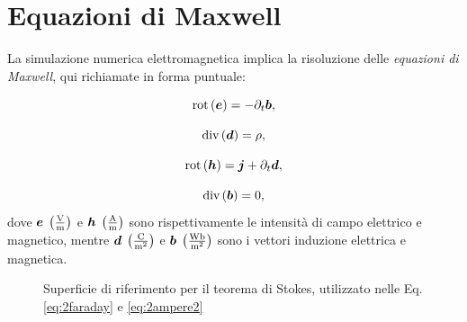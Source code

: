 

\label{cap:maxwell}

\section{Equazioni di Maxwell}

La simulazione numerica elettromagnetica implica la risoluzione delle \textit{equazioni di Maxwell}, qui richiamate in forma puntuale:

\begin{equation}
	\label{eq:2max1}
	\text{rot}\left(\boldsymbol{e}\right)=-\partial_t \boldsymbol{b},
\end{equation}

\begin{equation}
	\label{eq:2max2}
	\text{div}\left(\boldsymbol{d}\right)=\rho,
\end{equation}

\begin{equation}
	\label{eq:2max3}
	\text{rot}\left(\boldsymbol{h}\right)=\boldsymbol{j}+\partial_t \boldsymbol{d},
\end{equation}

\begin{equation}
	\label{eq:2max4}
	\text{div}\left(\boldsymbol{b}\right)=0,
\end{equation}
dove $\boldsymbol{e} \; \left( \frac{\text{V}}{\text{m}} \right)$ e $\boldsymbol{h} \; \left( \frac{\text{A}}{\text{m}} \right)$ sono rispettivamente le intensità di campo elettrico e magnetico, mentre $\boldsymbol{d} \; \left( \frac{\text{C}}{\text{m}^2} \right)$ e $\boldsymbol{b} \; \left( \frac{\text{Wb}}{\text{m}^2} \right)$ sono i vettori induzione elettrica e magnetica. 
\begin{figure}
\caption{Superficie di riferimento per il teorema di Stokes, utilizzato nelle Eq. \eqref{eq:2faraday} e \eqref{eq:2ampere2}}
\label{fig:2.1}
\end{figure}

